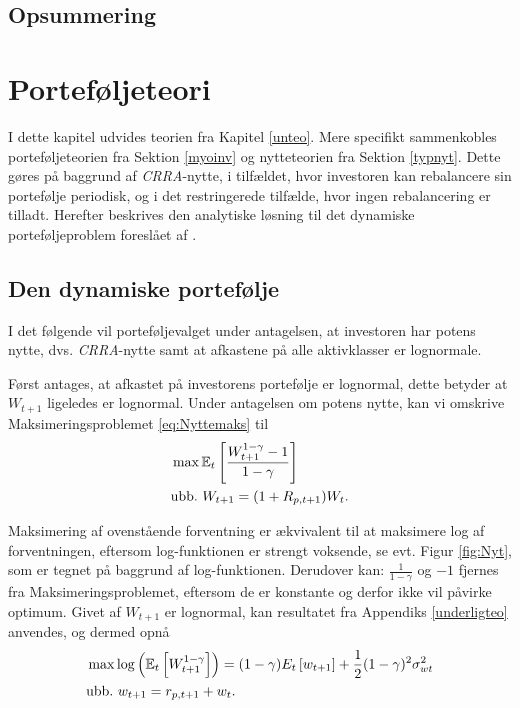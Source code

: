 \documentclass[
  a4paper,
  oneside]{memoir}
\begin{document}
\hypertarget{opsummering}{%
\section{Opsummering}\label{opsummering}}

\hypertarget{porteteori}{%
\chapter{Porteføljeteori}\label{porteteori}}

I dette kapitel udvides teorien fra Kapitel \ref{unteo}. Mere specifikt sammenkobles porteføljeteorien fra Sektion \ref{myoinv} og nytteteorien fra Sektion \ref{typnyt}. Dette gøres på baggrund af \emph{CRRA}-nytte, i tilfældet, hvor investoren kan rebalancere sin portefølje periodisk, og i det restringerede tilfælde, hvor ingen rebalancering er tilladt. Herefter beskrives den analytiske løsning til det dynamiske porteføljeproblem foreslået af \citep{JurVic2011}.

\hypertarget{crraportef}{%
\section{Den dynamiske portefølje}\label{crraportef}}

I det følgende vil porteføljevalget under antagelsen, at investoren har potens nytte, dvs. \emph{CRRA}-nytte samt at afkastene på alle aktivklasser er lognormale.

Først antages, at afkastet på investorens portefølje er lognormal, dette betyder at \(W_{t+1}\) ligeledes er lognormal. Under antagelsen om potens nytte, kan vi omskrive Maksimeringsproblemet \eqref{eq:Nyttemaks} til
\begin{align}
&\max\mathbb{E}_t\left[\frac{W_{t+1}^{1-\gamma}-1}{1-\gamma}\right] \label{eq:CRRAmaks}\\
&\text{ubb.}\,\,W_{t+1}=(1+R_{p,t+1})W_t.\notag
\end{align}

Maksimering af ovenstående forventning er ækvivalent til at maksimere log af forventningen, eftersom log-funktionen er strengt voksende, se evt. Figur \ref{fig:Nyt}, som er tegnet på baggrund af log-funktionen. Derudover kan: \(\tfrac{1}{1-\gamma}\) og \(-1\) fjernes fra Maksimeringsproblemet, eftersom de er konstante og derfor ikke vil påvirke optimum. Givet af \(W_{t+1}\) er lognormal, kan resultatet fra Appendiks \ref{underligteo} anvendes, og dermed opnå
\begin{align}
&\max \log\left(\mathbb{E}_t\left[W_{t+1}^{1-\gamma}\right]\right)=(1-\gamma){E}_t\left[w_{t+1}\right]+\frac{1}{2}(1-\gamma)^2\sigma_{wt}^2 \label{eq:CRRAmakslog}\\
&\text{ubb.}\,\,w_{t+1}=r_{p,t+1} + w_t.\notag
\end{align}
\end{document}
